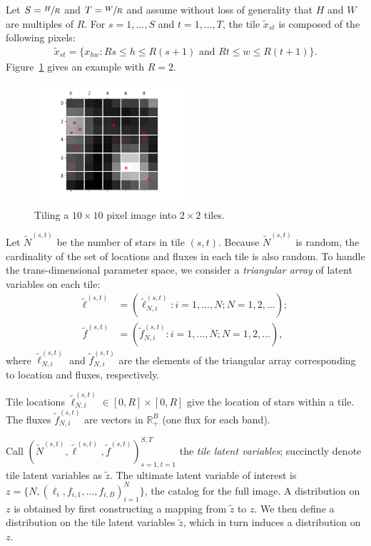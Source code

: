 Let $S = \sfrac{H}{R}$ and $T = \sfrac{W}{R}$ and assume without loss of generality that $H$ and $W$ are multiples of $R$.
For $s = 1, ..., S$ and $t = 1, ..., T$,
the tile $\tilde x_{st}$ is composed of the following pixels:
\begin{align}
    \tilde x_{st} = \{x_{hw} : Rs \leq h \leq R(s+1) \text{ and } Rt \leq w \leq R(t+1)\}.
    \label{eq:tiles}
\end{align}
Figure~\ref{fig:ex_tiles} gives an example with $R = 2$. 
\begin{figure}[!h]
    \centering
    \includegraphics[width = 0.5\textwidth]{figures/vi_figures/example_tiled.png}
    \caption{Tiling a $10 \times 10$ pixel image into $2 \times 2$ tiles.}
    \label{fig:ex_tiles}
\end{figure}

Let $\tilde N^{(s, t)}$ be the number of stars in tile 
$(s,t)$.
Because $\tilde N^{(s, t)}$ is random, 
the cardinality of the set of locations and fluxes in each tile
is also random. 
To handle the trans-dimensional parameter space, 
we consider a {\itshape triangular array} of latent variables
on each tile:
\begin{align}
    \tilde\ell^{(s, t)} &= (\tilde\ell_{N, i}^{(s, t)} : i = 1, ..., N; N = 1, 2, ...); \\
    \tilde f^{(s, t)} &= (\tilde f_{N, i}^{(s, t)} : i = 1, ..., N; N = 1, 2, ...),
\end{align}
where $\tilde\ell_{N, i}^{(s, t)}$ and $\tilde f_{N, i}^{(s, t)}$ are the elements of the triangular array corresponding to location and fluxes, respectively. 

Tile locations $\tilde\ell_{N, i}^{(s, t)} \in [0, R]\times[0, R]$ give the location of stars within a tile. The fluxes $\tilde f_{N, i}^{(s, t)}$ are vectors in $\mathbb{R}^B_+$ (one flux for each band). 

Call $(\tilde N^{(s, t)}, \tilde \ell^{(s, t)}, \tilde f^{(s, t)})_{s=1,t=1}^{S,T}$ the {\itshape tile latent variables}; 
succinctly denote tile latent variables as $\tilde z$. 
The ultimate latent variable of interest is $z = \{N, (\ell_i, f_{i,1}, ..., f_{i,B})_{i = 1}^N\}$, the catalog for the full image. 
A distribution on $z$ is obtained by first constructing a mapping from $\tilde z$ to $z$.
We then define a distribution 
on the tile latent variables $\tilde z$, which in turn  induces 
a distribution on $z$.  


